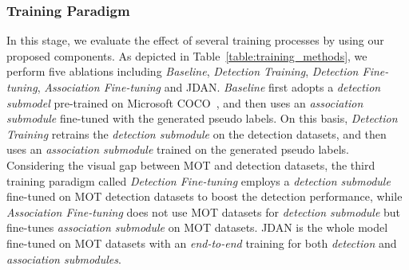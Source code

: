 \documentclass[acmsmall]{acmart}
\begin{document}
\subsubsection{{Training Paradigm}}
In this stage, we evaluate the effect of several training processes by using our proposed components. 
As depicted in Table~\ref{table:training_methods}, we perform five ablations including {\emph{Baseline}, \emph{Detection Training}, \emph{Detection Fine-tuning}, \emph{Association Fine-tuning}} and JDAN. 
{
\emph{Baseline} first adopts a \emph{detection submodel} pre-trained on Microsoft COCO~\cite{lin2014microsoft}, and then uses an \emph{association submodule} fine-tuned with the generated pseudo labels.
On this basis, \emph{Detection Training} retrains the \emph{detection submodule} on the detection datasets, and then uses an \emph{association submodule} trained on the generated pseudo labels. 
Considering the visual gap between MOT and detection datasets, the third training paradigm called \emph{Detection Fine-tuning} employs a \emph{detection submodule} fine-tuned on MOT detection datasets to boost the detection performance,
while \emph{Association Fine-tuning} does not use MOT datasets for \emph{detection submodule} but fine-tunes \emph{association submodule} on MOT datasets.
}
JDAN is the whole model fine-tuned on MOT datasets with an \emph{end-to-end} training for both \emph{detection} and \emph{association submodules}. 
\end{document}
